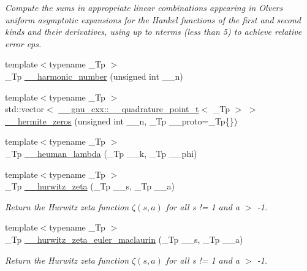 \begin{DoxyCompactItemize}
\begin{DoxyCompactList}\small\item\em Compute the sums in appropriate linear combinations appearing in Olver\textquotesingle{}s uniform asymptotic expansions for the Hankel functions of the first and second kinds and their derivatives, using up to nterms (less than 5) to achieve relative error {\ttfamily eps}. \end{DoxyCompactList}\item 
{\footnotesize template$<$typename \+\_\+\+Tp $>$ }\\\+\_\+\+Tp \hyperlink{namespacestd_1_1____detail_aeab2857a72e09b180a765bf435f72c2e}{\+\_\+\+\_\+harmonic\+\_\+number} (unsigned int \+\_\+\+\_\+n)
\item 
{\footnotesize template$<$typename \+\_\+\+Tp $>$ }\\std\+::vector$<$ \hyperlink{struct____gnu__cxx_1_1____quadrature__point__t}{\+\_\+\+\_\+gnu\+\_\+cxx\+::\+\_\+\+\_\+quadrature\+\_\+point\+\_\+t}$<$ \+\_\+\+Tp $>$ $>$ \hyperlink{namespacestd_1_1____detail_a34e064cf8ddf0680ce559ba3f976c6dd}{\+\_\+\+\_\+hermite\+\_\+zeros} (unsigned int \+\_\+\+\_\+n, \+\_\+\+Tp \+\_\+\+\_\+proto=\+\_\+\+Tp\{\})
\item 
{\footnotesize template$<$typename \+\_\+\+Tp $>$ }\\\+\_\+\+Tp \hyperlink{namespacestd_1_1____detail_a90938823a16cabc06031ebf209066a94}{\+\_\+\+\_\+heuman\+\_\+lambda} (\+\_\+\+Tp \+\_\+\+\_\+k, \+\_\+\+Tp \+\_\+\+\_\+phi)
\item 
{\footnotesize template$<$typename \+\_\+\+Tp $>$ }\\\+\_\+\+Tp \hyperlink{namespacestd_1_1____detail_a63aafed798ada71b2cc58e84a6652169}{\+\_\+\+\_\+hurwitz\+\_\+zeta} (\+\_\+\+Tp \+\_\+\+\_\+s, \+\_\+\+Tp \+\_\+\+\_\+a)
\begin{DoxyCompactList}\small\item\em Return the Hurwitz zeta function $ \zeta(s,a) $ for all s != 1 and a $>$ -\/1. \end{DoxyCompactList}\item 
{\footnotesize template$<$typename \+\_\+\+Tp $>$ }\\\+\_\+\+Tp \hyperlink{namespacestd_1_1____detail_a56c55858723fe9e0c541f0e77572b58d}{\+\_\+\+\_\+hurwitz\+\_\+zeta\+\_\+euler\+\_\+maclaurin} (\+\_\+\+Tp \+\_\+\+\_\+s, \+\_\+\+Tp \+\_\+\+\_\+a)
\begin{DoxyCompactList}\small\item\em Return the Hurwitz zeta function $ \zeta(s,a) $ for all s != 1 and a $>$ -\/1. \end{DoxyCompactList}\item 

\end{DoxyCompactItemize}
